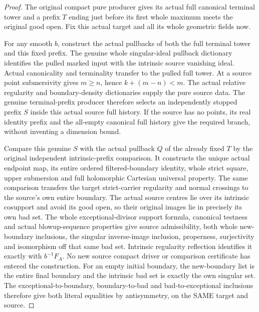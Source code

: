 \begin{proof}
The original compact pure producer gives its actual full canonical
terminal tower and a prefix $T$ ending just before its first whole
maximum meets the original good open. Fix this actual target and all
its whole geometric fields now.

For any smooth $b$, construct the actual pullbacks of both the full
terminal tower and this fixed prefix. The genuine whole singular-ideal
pullback dictionary identifies the pulled marked input with the
intrinsic source vanishing ideal. Actual canonicality and terminality
transfer to the pulled full tower. At a source point submersivity
gives $m\ge n$, hence $k+(m-n)<m$. The actual relative regularity and
boundary-density dictionaries supply the pure source data. The genuine
terminal-prefix producer therefore selects an independently stopped
prefix $S$ inside this actual source full history. If the source has
no points, its real identity prefix and the all-empty canonical full
history give the required branch, without inventing a dimension bound.

Compare this genuine $S$ with the actual pullback $Q$ of the already
fixed $T$ by the original independent intrinsic-prefix comparison.
It constructs the unique actual endpoint map, its entire ordered
filtered-boundary identity, whole strict square, upper submersion and
full holomorphic Cartesian universal property. The same comparison
transfers the target strict-carrier regularity and normal crossings
to the source's own entire boundary. The actual source centres lie
over its intrinsic cosupport and avoid its good open, so their original
images lie in precisely its own bad set. The whole exceptional-divisor
support formula, canonical testness and actual blowup-sequence
properties give source admissibility, both whole new-boundary
inclusions, the singular inverse-image inclusion, properness,
surjectivity and isomorphism off that same bad set. Intrinsic regularity
reflection identifies it exactly with $b^{-1}F_A$. No new source
compact driver or comparison certificate has entered the construction.
For an empty initial boundary, the new-boundary list is the entire
final boundary and the intrinsic bad set is exactly the own singular
set. The exceptional-to-boundary, boundary-to-bad and
bad-to-exceptional inclusions therefore give both literal equalities
by antisymmetry, on the SAME target and source.
\end{proof}

